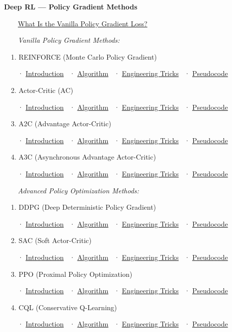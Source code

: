 \documentclass[11pt]{article}
\begin{document}
  \textbf{Deep RL --- Policy Gradient Methods}

    \hyperref[vanilla-pg-loss]{What Is the Vanilla Policy Gradient
Loss?}

    \emph{Vanilla Policy Gradient Methods:}

   1. REINFORCE (Monte Carlo Policy Gradient)

   ~~· \hyperref[intro-4-1]{Introduction} ~·
\hyperref[reinforce]{Algorithm} ~· \hyperref[tricks-4-1]{Engineering
Tricks} ~· \hyperref[pseudo-4-1]{Pseudocode}

   2. Actor-Critic (AC)

   ~~· \hyperref[intro-4-2]{Introduction} ~·
\hyperref[actor-critic]{Algorithm} ~· \hyperref[tricks-4-2]{Engineering
Tricks} ~· \hyperref[pseudo-4-2]{Pseudocode}

   3. A2C (Advantage Actor-Critic)

   ~~· \hyperref[intro-4-3]{Introduction} ~· \hyperref[a2c]{Algorithm}
~· \hyperref[tricks-4-3]{Engineering Tricks} ~·
\hyperref[pseudo-4-3]{Pseudocode}

   4. A3C (Asynchronous Advantage Actor-Critic)

   ~~· \hyperref[intro-4-4]{Introduction} ~· \hyperref[a3c]{Algorithm}
~· \hyperref[tricks-4-4]{Engineering Tricks} ~·
\hyperref[pseudo-4-4]{Pseudocode}

    \emph{Advanced Policy Optimization Methods:}

   1. DDPG (Deep Deterministic Policy Gradient)

   ~~· \hyperref[intro-4-5]{Introduction} ~· \hyperref[ddpg]{Algorithm}
~· \hyperref[tricks-4-5]{Engineering Tricks} ~·
\hyperref[pseudo-4-5]{Pseudocode}

   2. SAC (Soft Actor-Critic)

   ~~· \hyperref[intro-4-6]{Introduction} ~· \hyperref[sac]{Algorithm}
~· \hyperref[tricks-4-6]{Engineering Tricks} ~·
\hyperref[pseudo-4-6]{Pseudocode}

   3. PPO (Proximal Policy Optimization)

   ~~· \hyperref[intro-4-7]{Introduction} ~· \hyperref[ppo]{Algorithm}
~· \hyperref[tricks-4-7]{Engineering Tricks} ~·
\hyperref[pseudo-4-7]{Pseudocode}

   4. CQL (Conservative Q-Learning)

   ~~· \hyperref[intro-4-8]{Introduction} ~· \hyperref[cql]{Algorithm}
~· \hyperref[tricks-4-8]{Engineering Tricks} ~·
\hyperref[pseudo-4-8]{Pseudocode}

    \clearpage
\end{document}
